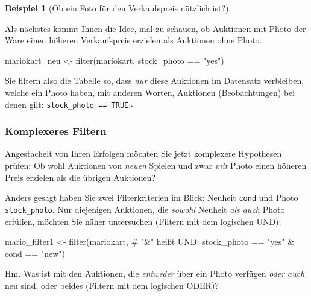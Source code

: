 \documentclass[
  letterpaper,
]{scrbook}
\newenvironment{Shaded}{\begin{snugshade}}{\end{snugshade}}
\newcommand{\CommentTok}[1]{\textcolor[rgb]{0.37,0.37,0.37}{#1}}
\newcommand{\FunctionTok}[1]{\textcolor[rgb]{0.28,0.35,0.67}{#1}}
\newcommand{\NormalTok}[1]{\textcolor[rgb]{0.00,0.23,0.31}{#1}}
\newcommand{\OtherTok}[1]{\textcolor[rgb]{0.00,0.23,0.31}{#1}}
\newcommand{\SpecialCharTok}[1]{\textcolor[rgb]{0.37,0.37,0.37}{#1}}
\newcommand{\StringTok}[1]{\textcolor[rgb]{0.13,0.47,0.30}{#1}}
\theoremstyle{definition}
\newtheorem{example}{Beispiel}[chapter]
\theoremstyle{definition}
\theoremstyle{definition}
\theoremstyle{remark}
\begin{document}
\begin{example}[Ob ein Foto für den Verkaufspreis nützlich
ist?]\protect\hypertarget{exm-filter}{}\label{exm-filter}

Als nächstes kommt Ihnen die Idee, mal zu schauen, ob Auktionen mit
Photo der Ware einen höheren Verkaufspreis erzielen als Auktionen ohne
Photo.

\begin{Shaded}
\begin{Highlighting}[]
\NormalTok{mariokart\_neu }\OtherTok{\textless{}{-}} \FunctionTok{filter}\NormalTok{(mariokart, stock\_photo }\SpecialCharTok{==} \StringTok{"yes"}\NormalTok{)}
\end{Highlighting}
\end{Shaded}

Sie filtern also die Tabelle so, dass \emph{nur} diese Auktionen im
Datensatz verbleiben, welche ein Photo haben, mit anderen Worten,
Auktionen (Beobachtungen) bei denen gilt:
\texttt{stock\_photo\ ==\ TRUE}.\(\square\)

\end{example}

\subsubsection{Komplexeres Filtern}\label{komplexeres-filtern}

Angestachelt von Ihren Erfolgen möchten Sie jetzt komplexere Hypothesen
prüfen: Ob wohl Auktionen von \emph{neuen} Spielen und zwar \emph{mit}
Photo einen höheren Preis erzielen als die übrigen Auktionen?

Anders gesagt haben Sie zwei Filterkriterien im Blick: Neuheit
\texttt{cond} und Photo \texttt{stock\_photo}. Nur diejenigen Auktionen,
die \emph{sowohl} Neuheit \emph{als auch} Photo erfüllen, möchten Sie
näher untersuchen (Filtern mit dem logischen UND):

\begin{Shaded}
\begin{Highlighting}[]
\NormalTok{mario\_filter1 }\OtherTok{\textless{}{-}} 
  \FunctionTok{filter}\NormalTok{(mariokart,  }\CommentTok{\# "\&" heißt UND:}
\NormalTok{         stock\_photo }\SpecialCharTok{==} \StringTok{"yes"} \SpecialCharTok{\&}\NormalTok{ cond }\SpecialCharTok{==} \StringTok{"new"}\NormalTok{)}
\end{Highlighting}
\end{Shaded}

Hm. Was ist mit den Auktionen, die \emph{entweder} über ein Photo
verfügen \emph{oder auch} neu sind, oder beides (Filtern mit dem
logischen ODER)?
\end{document}
